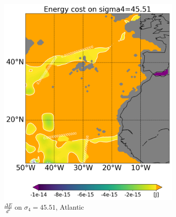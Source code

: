 \begin{figure}[htbp]
\begin{subfigure}[b]{0.4\textwidth}
         \includegraphics[width=\textwidth]{plots/energy/atlantic_energy/Map2dcyl_neg_energy_on_sigma4_4551e-2_reg310Eto360E05Nto57N_1990to1998av_WOCE.png}
         \caption{$\frac{\Delta E}{d^2}$ on $\sigma_4 = 45.51$, Atlantic}
         \label{fig:subplot_atlantic_neg_energy_sigma_4}
     \end{subfigure}
     \hfill
     \begin{subfigure}[b]{0.4\textwidth}
         

\end{subfigure}
\end{figure}
